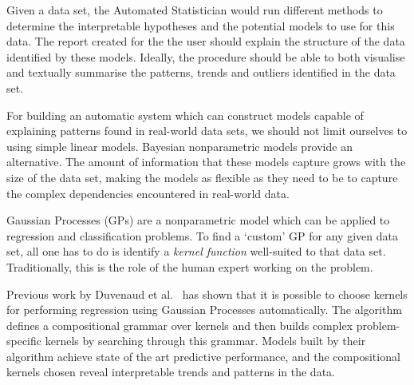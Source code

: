 \documentclass[a4paper,12pt ]{report}
\begin{document}
 Given a data set, the Automated Statistician would run different methods to determine the interpretable hypotheses and the potential models to use for this data. The report created for the the user should explain the structure of the data identified by these models. Ideally, the procedure should be able to both visualise and textually summarise the patterns, trends and outliers identified in the data set. %



For building an automatic system which can construct models capable of explaining patterns found in real-world data sets, we should not limit ourselves to using simple linear models. Bayesian nonparametric models provide an alternative. The amount of information that these models capture grows with the size of the data set, making the models as flexible as they need to be to capture the complex dependencies encountered in real-world data.

Gaussian Processes (GPs) are a nonparametric model which can be applied to regression and classification problems. To find a `custom' GP for any given data set, all one has to do is identify a \emph{kernel function} well-suited to that data set. Traditionally, this is the role of the human expert working on the problem.

Previous work by Duvenaud et al.~\cite{duvenaud13} has shown that it is possible to choose kernels for performing regression using Gaussian Processes automatically. The algorithm defines a compositional grammar over kernels and then builds complex problem-specific kernels by searching through this grammar. Models built by their algorithm achieve state of the art predictive performance, and the compositional kernels chosen reveal interpretable trends and patterns in the data.

\end{document}
